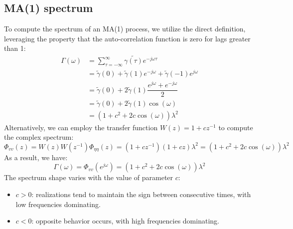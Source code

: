 \subsection{MA(1) spectrum}
To compute the spectrum of an MA(1) process, we utilize the direct definition, leveraging the property that the auto-correlation function is zero for lags greater than 1:
\begin{align*}
    \Gamma(\omega)  &= \sum_{\tau=-\infty}^\infty\tilde{\gamma(\tau)}e^{-j\omega\tau} \\
                    &= \tilde{\gamma}(0) + \tilde{\gamma}(1)e^{-j\omega}+\tilde{\gamma}(-1)e^{j\omega} \\
                    &= \tilde{\gamma}(0) +2\tilde{\gamma}(1)\dfrac{e^{j\omega}+e^{-j\omega}}{2} \\
                    &= \tilde{\gamma}(0) +2\tilde{\gamma}(1)\cos(\omega) \\
                    &= \left(1+c^2+2c\cos(\omega)\right)\lambda^2
\end{align*}
Alternatively, we can employ the transfer function $W(z) = 1 + cz^{-1}$ to compute the complex spectrum:
\[\Phi_{vv}(z)=W(z)W(z^{-1})\Phi_{\eta\eta}(z)=(1+cz^{-1})(1+cz)\lambda^2=\left(1+c^2+2c\cos(\omega)\right)\lambda^2\]
As a result, we have: 
\[\Gamma(\omega)=\Phi_{vv}(e^{j\omega})=\left(1+c^2+2c\cos(\omega)\right)\lambda^2\]
The spectrum shape varies with the value of parameter $c$: 
\begin{itemize}
    \item $c>0$: realizations tend to maintain the sign between consecutive times, with low frequencies dominating.
    \item $c<0$: opposite behavior occurs, with high frequencies dominating.
\end{itemize}

